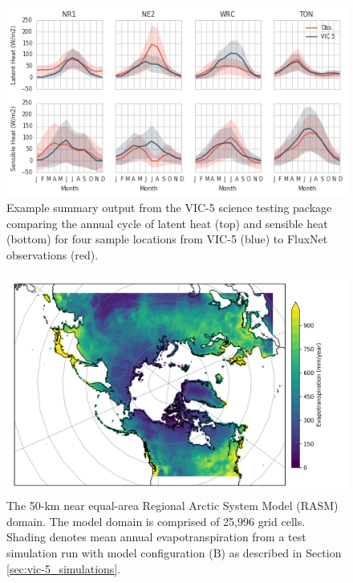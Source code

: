 \documentclass[gmd, manuscript]{copernicus}
\begin{document}
\clearpage
\begin{figure}[t]
\includegraphics[width=12cm]{VIC_science_tests_fluxes.png}
\caption{Example summary output from the VIC-5 science testing package comparing the annual cycle of latent heat (top) and sensible heat (bottom) for four sample locations from VIC-5 (blue) to FluxNet observations (red).}
\label{fig:vic_fluxes}
\end{figure}

\clearpage
\begin{figure}[t]
\includegraphics[width=6in]{RASM_domain_fig.png}
\caption{The 50-km near equal-area Regional Arctic System Model (RASM) domain. The model domain is comprised of 25,996 grid cells. Shading denotes mean annual evapotranspiration from a test simulation run with model configuration (B) as described in Section \ref{sec:vic-5_simulations}.}
\label{fig:vic_domain}
\end{figure}
\end{document}
